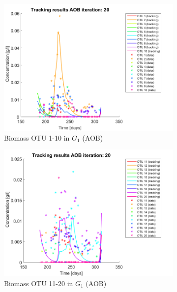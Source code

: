 \documentclass[3p,times]{article}
\begin{document}
\begin{figure}[h]
	\centering
	\begin{subfigure}{0.45 \textwidth}
		\includegraphics[width =\textwidth]{Application//200407_iter_20_AOB_plot_1}
		\caption{Biomass OTU 1-10 in $G_1$ (AOB) }
	\end{subfigure}
	\begin{subfigure}{0.45 \textwidth}
	\includegraphics[width =\textwidth]{Application//200407_iter_20_AOB_plot_2}
	\caption{Biomass OTU 11-20 in $G_1$ (AOB) }
	\end{subfigure}
	\begin{subfigure}{0.45 \textwidth}

\end{subfigure}
\end{figure}
\end{document}
